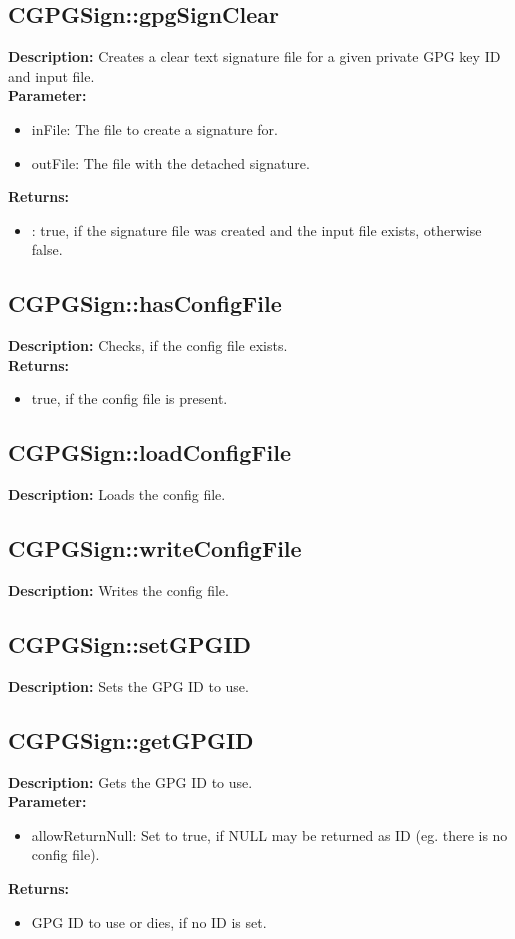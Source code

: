 \subsection{CGPGSign::gpgSignClear}
\textbf{Description:} Creates a clear text signature file for a given private GPG key ID and input file.\\
\textbf{Parameter:}
\begin{itemize}
\item inFile: The file to create a signature for.
\item outFile: The file with the detached signature.
\end{itemize}
\textbf{Returns:}
\begin{itemize}
\item : true, if the signature file was created and the input file exists, otherwise false.
\end{itemize}

\subsection{CGPGSign::hasConfigFile}
\textbf{Description:} Checks, if the config file exists.\\
\textbf{Returns:}
\begin{itemize}
\item true, if the config file is present.
\end{itemize}

\subsection{CGPGSign::loadConfigFile}
\textbf{Description:} Loads the config file.\\

\subsection{CGPGSign::writeConfigFile}
\textbf{Description:} Writes the config file.\\

\subsection{CGPGSign::setGPGID}
\textbf{Description:} Sets the GPG ID to use.\\

\subsection{CGPGSign::getGPGID}
\textbf{Description:} Gets the GPG ID to use.\\
\textbf{Parameter:}
\begin{itemize}
\item allowReturnNull: Set to true, if NULL may be returned as ID (eg. there is no config file).
\end{itemize}
\textbf{Returns:}
\begin{itemize}
\item GPG ID to use or dies, if no ID is set.
\end{itemize}

